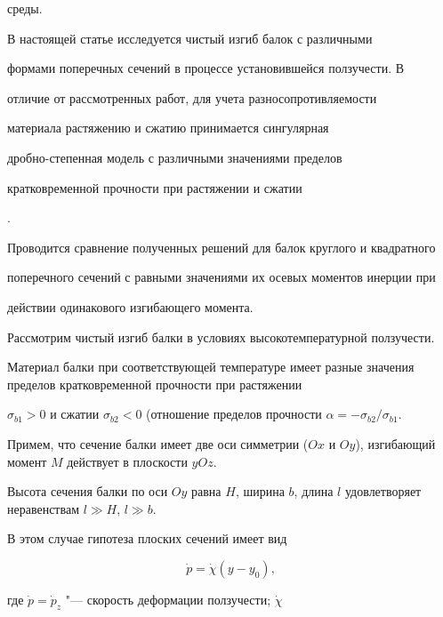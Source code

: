 среды.



В настоящей статье исследуется чистый изгиб балок с различными

формами поперечных сечений в процессе установившейся ползучести. В

отличие от рассмотренных работ, для учета разносопротивляемости

материала растяжению и сжатию принимается сингулярная

дробно-степенная модель с различными значениями пределов

кратковременной прочности при растяжении и сжатии

\cite{loko:bib14,loko:bib15}.



Проводится сравнение полученных решений для балок круглого и квадратного

поперечного сечений с равными значениями их осевых моментов инерции при

действии одинакового изгибающего момента.



\smallskip




Рассмотрим чистый изгиб балки в условиях высокотемпературной  ползучести. 

Материал балки при соответствующей температуре имеет разные значения пределов кратковременной прочности при растяжении

$\sigma _{b1} >0$ и сжатии $\sigma _{b2} <0$ (отношение пределов прочности $\alpha =-\sigma _{b2}/\sigma _{b1}$. 

Примем, что сечение балки имеет две оси симметрии ($Ox$ и $Oy$), изгибающий момент $M$ действует в плоскости $yOz$. 

Высота сечения балки по оси $Oy$ равна $H$, ширина $b$, длина $l$ удовлетворяет неравенствам $l\gg H$, $l\gg b$.



В этом случае гипотеза плоских сечений имеет вид

\begin{equation}

\label{loko:eq1}

\dot{p}=\dot{\chi}(y-y_0),

\end{equation}

где $\dot {p}=\dot {p}_z $ "--- скорость деформации ползучести; $\dot {\chi }$

